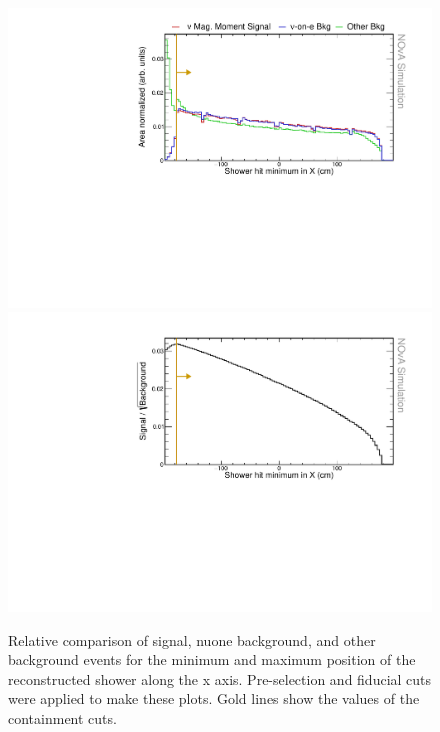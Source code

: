 \begin{figure}[hbtp]
\centering
\includegraphics[width=.9\textwidth]{Plots/NuMMEventSelection/N1Cut_minX.pdf}
\includegraphics[width=.9\textwidth]{Plots/NuMMEventSelection/NuMM_N1Cut_minXright_FOMStats.pdf}
\caption{Relative comparison of signal, \acrshort{nuone} background, and other background events for the minimum and maximum position of the reconstructed shower along the x axis. Pre-selection and fiducial cuts were applied to make these plots. Gold lines show the values of the containment cuts.}
\label{fig:NuMMContainmentCutMinX}
\end{figure}

